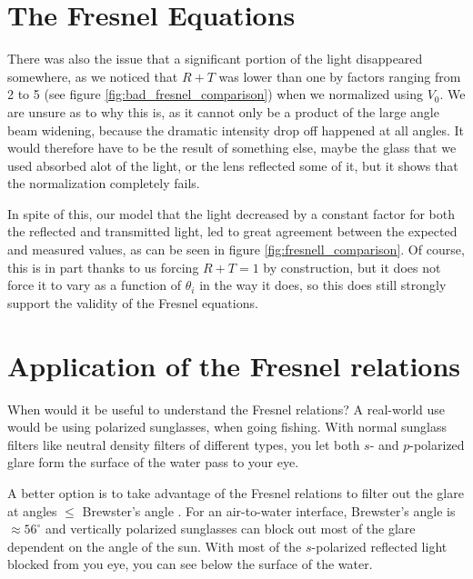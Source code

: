 \section{The Fresnel Equations}
There was also the issue that a significant portion of the light disappeared somewhere, 
as we noticed that $R + T$ was lower than one by factors ranging from 2 to 5 (see figure \ref{fig:bad_fresnel_comparison}) when we normalized using $V_0$.
We are unsure as to why this is, 
as it cannot only be a product of the large angle beam widening, because the dramatic intensity drop off happened at all angles.
It would therefore have to be the result of something else, 
maybe the glass that we used absorbed alot of the light, or the lens reflected some of it, but it shows that the normalization completely fails.

In spite of this, our model that the light decreased by a constant factor for both the reflected and transmitted light, 
led to great agreement between the expected and measured values, as can be seen in figure \ref{fig:fresnell_comparison}.
Of course, this is in part thanks to us forcing $R + T = 1$ by construction, but it does not force it to vary as a function of $\theta_i$ in the way it does, 
so this does still strongly support the validity of the Fresnel equations.

\section{Application of the Fresnel relations}
When would it be useful to understand the Fresnel relations? \newline
A real-world use would be using polarized \mbox{sunglasses}, when going fishing. 
With normal \mbox{sunglass} filters like neutral density filters of \mbox{different} types, you let both $s$- and $p$-polarized glare form the surface of the water pass to your eye.

A better option is to take advantage of the Fresnel relations to filter out the glare at angles $\le$ Brewster's angle \autocite{paschotta_brewster}.
For an air-to-water \mbox{interface}, Brewster's angle is $\approx 56^\circ$ and vertically polarized sunglasses can block out most of the glare dependent on the angle of the sun.
With most of the $s$-polarized reflected light blocked from you eye, you can see below the surface of the water.